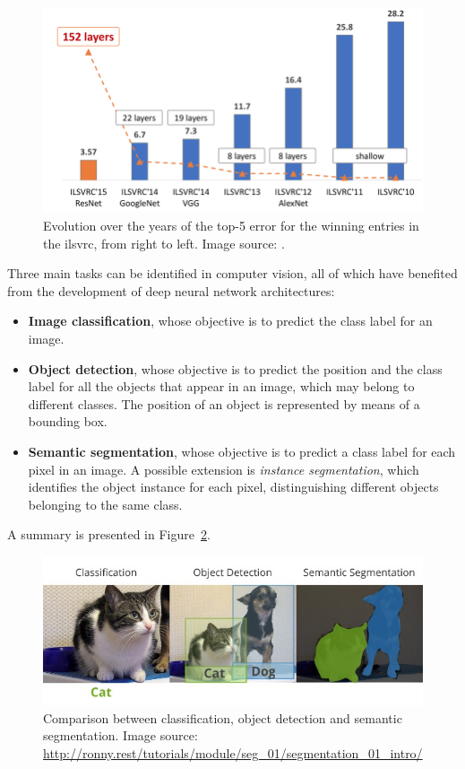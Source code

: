 \documentclass[%
    corpo=12pt,
    twoside,
    stile=classica,   
    tipotesi=magistrale,
    evenboxes,
    english,
	numerazioneromana,
]{toptesi}
\begin{document}
\begin{figure}[ht]
	\centering
	\includegraphics[width=.8\textwidth]{imgs/ILSVRC.png}
	\caption[Evolution of top-5 error for the winning entries in \gls{ilsvrc}]{Evolution over the years of the top-5 error for the winning entries in the \gls{ilsvrc}, from right to left\cite{russakovsky2015imagenet}. Image source: \cite{hanqing2020research}.
	\label{fig:imagenet}}
\end{figure}

\bigskip
Three main tasks can be identified in computer vision, all of which have benefited from the development of deep neural network architectures:

\begin{itemize}
	\item \textbf{Image classification}, whose objective is to predict the class label for an image.
	\item \textbf{Object detection}, whose objective is to predict the position and the class label for all the objects that appear in an image, which may belong to different classes. The position of an object is represented by means of a bounding box.
	\item \textbf{Semantic segmentation}, whose objective is to predict a class label for each pixel in an image. A possible extension is \textit{instance segmentation}, which identifies the object instance for each pixel, distinguishing different objects belonging to the same class.
\end{itemize}

A summary is presented in Figure~\ref{fig:classdetseg}.

\begin{figure}
	\centering
	\includegraphics[width=.9\textwidth]{imgs/classification_detection_segmentaion.jpeg}
	\caption[Comparison between classification, object detection and semantic segmentation]{Comparison between classification, object detection and semantic segmentation. Image source: \url{http://ronny.rest/tutorials/module/seg_01/segmentation_01_intro/}}
	\label{fig:classdetseg}
\end{figure}
\end{document}
